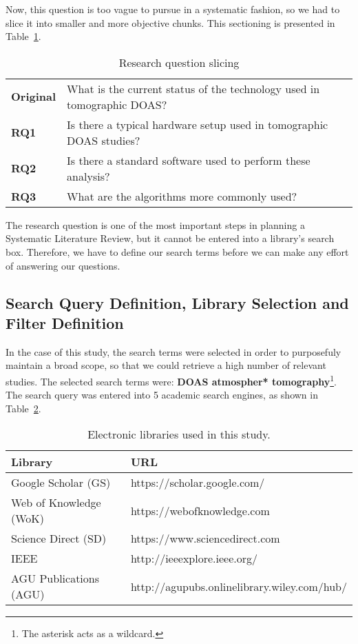 Now, this question is too vague to pursue in a systematic fashion, so we
had to slice it into smaller and more objective chunks. This sectioning
is presented in Table~\ref{tab:rq_slicing}.

\begin{table}[htb]
\centering
\small
\caption{Research question slicing}
\label{tab:rq_slicing}
    \begin{tabularx}{\textwidth}{lX}
        \toprule
        \textbf{Original} & What is the current status of the technology used in
        tomographic DOAS? \\
        \textbf{RQ1} & Is there a typical hardware setup used in tomographic
        DOAS studies? \\
        \textbf{RQ2} & Is there a standard software used to perform these
        analysis? \\
        \textbf{RQ3} & What are the algorithms more commonly used?\\\bottomrule
    \end{tabularx}
\end{table}

The research question is one of the most important steps in planning a
Systematic Literature Review, but it cannot be entered into a library's
search box. Therefore, we have to define our search terms before we can
make any effort of answering our questions.

\subsection{Search Query Definition, Library Selection and Filter Definition}
\label{sub:library_selection_and_filter_definition}

In the case of this study, the search terms were selected in order to
purposefuly maintain a broad scope, so that we could retrieve a high
number of relevant studies. The selected search terms were: \textbf{DOAS
atmospher* tomography}\footnote{The asterisk acts as a wildcard.}. The
search query was entered into 5 academic search engines, as shown in
Table~\ref{tab:libraries}.

\begin{table}[htb]
\centering
\caption{Electronic libraries used in this study.}
\label{tab:libraries}
\begin{tabularx}{\textwidth}{ll}
\toprule
\textbf{Library}          & \textbf{URL}\\
\midrule
Google Scholar (GS)   & https://scholar.google.com/\\
Web of Knowledge (WoK)& https://webofknowledge.com\\
Science Direct (SD)   & https://www.sciencedirect.com\\
IEEE             & http://ieeexplore.ieee.org/\\
AGU Publications (AGU) & http://agupubs.onlinelibrary.wiley.com/hub/\\
\bottomrule
\end{tabularx}
\end{table}

